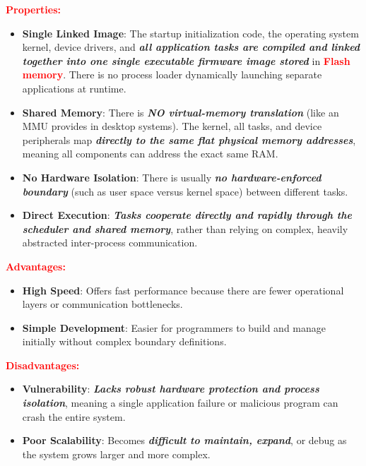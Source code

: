 \textbf{\textcolor{red}{Properties: }}
\begin{itemize}
    \item \textbf{Single Linked Image}: The startup initialization code, the operating system kernel, device drivers, and \textbf{\textit{all application tasks are compiled and linked together into one single executable firmware image stored}} in \textbf{\textcolor{red}{Flash memory}}. There is no process loader dynamically launching separate applications at runtime.
    \item \textbf{Shared Memory}: There is \textbf{\textit{NO virtual-memory translation}} (like an MMU provides in desktop systems). The kernel, all tasks, and device peripherals map \textbf{\textit{directly to the same flat physical memory addresses}}, meaning all components can address the exact same RAM.
    \item\textbf{ No Hardware Isolation}: There is usually \textbf{\textit{no hardware-enforced boundary}} (such as user space versus kernel space) between different tasks.
    \item \textbf{Direct Execution}: \textbf{\textit{Tasks cooperate directly and rapidly through the scheduler and shared memory}}, rather than relying on complex, heavily abstracted inter-process communication.
\end{itemize}       

\textbf{\textcolor{red}{Advantages: }}
\begin{itemize}
    \item \textbf{High Speed}: Offers fast performance because there are fewer operational layers or communication bottlenecks.
    
    \item \textbf{Simple Development}: Easier for programmers to build and manage initially without complex boundary definitions.
\end{itemize}    

\textbf{\textcolor{red}{Disadvantages:}}
\begin{itemize}
    \item \textbf{Vulnerability}: \textbf{\textit{Lacks robust hardware protection and process isolation}}, meaning a single application failure or malicious program can crash the entire system.
    
    \item \textbf{Poor Scalability}: Becomes \textbf{\textit{difficult to maintain, expand}}, or debug as the system grows larger and more complex.
\end{itemize} 

